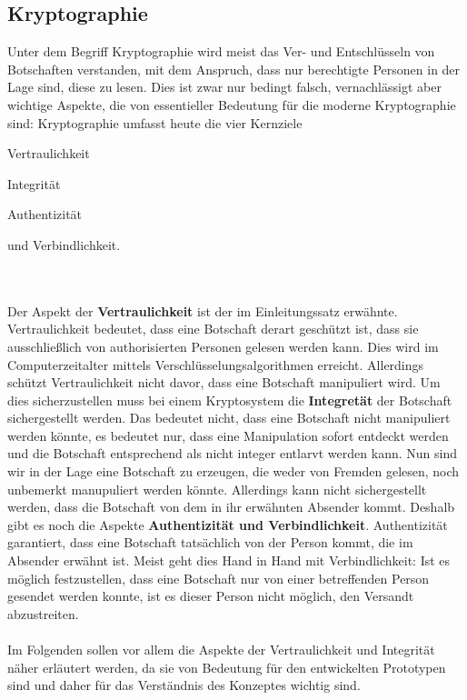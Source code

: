 \documentclass[13pt,a4paper,bibliography=totocnumbered,listof=totocnumbered]{scrartcl}
\begin{document}
\subsection{Kryptographie}\label{KryptV}
Unter dem Begriff Kryptographie wird meist das Ver- und Entschlüsseln von Botschaften verstanden, mit dem Anspruch, dass nur berechtigte Personen in der Lage sind, diese zu lesen. Dies ist zwar nur bedingt falsch, vernachlässigt aber wichtige Aspekte, die von essentieller Bedeutung für die moderne Kryptographie sind: Kryptographie umfasst heute die vier Kernziele
\begin{compactitem}
	\item Vertraulichkeit
	\item Integrität
	\item Authentizität
	\item und Verbindlichkeit.
\end{compactitem}
\cite[S. 14-17]{48} \cite[S. 2]{42}\\\\
Der Aspekt der \textbf{Vertraulichkeit} ist der im Einleitungssatz erwähnte. Vertraulichkeit bedeutet, dass eine Botschaft derart geschützt ist, dass sie ausschließlich von authorisierten Personen gelesen werden kann. Dies wird im Computerzeitalter mittels Verschlüsselungsalgorithmen erreicht. Allerdings schützt Vertraulichkeit nicht davor, dass eine Botschaft manipuliert wird. Um dies sicherzustellen muss bei einem Kryptosystem die \textbf{Integretät} der Botschaft sichergestellt werden. Das bedeutet nicht, dass eine Botschaft nicht manipuliert werden könnte, es bedeutet nur, dass eine Manipulation sofort entdeckt werden und die Botschaft entsprechend als nicht integer entlarvt werden kann. Nun sind wir in der Lage eine Botschaft zu erzeugen, die weder von Fremden gelesen, noch unbemerkt manupuliert werden könnte. Allerdings kann nicht sichergestellt werden, dass die Botschaft von dem in ihr erwähnten Absender kommt. Deshalb gibt es noch die Aspekte \textbf{Authentizität und Verbindlichkeit}. Authentizität garantiert, dass eine Botschaft tatsächlich von der Person kommt, die im Absender erwähnt ist. Meist geht dies Hand in Hand mit Verbindlichkeit: Ist es möglich festzustellen, dass eine Botschaft nur von einer betreffenden Person gesendet werden konnte, ist es dieser Person nicht möglich, den Versandt abzustreiten.\\
 \cite[S. 2]{42} \cite[S. 14-17]{48}\\

Im Folgenden sollen vor allem die Aspekte der Vertraulichkeit und Integrität näher erläutert werden, da sie von Bedeutung für den entwickelten Prototypen sind und daher für das Verständnis des Konzeptes wichtig sind.
\end{document}
